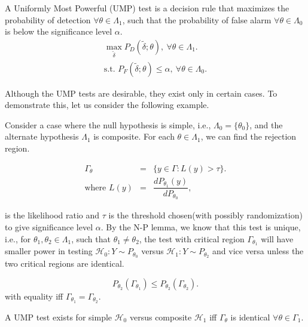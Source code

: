 \documentclass[a4paper,english,12pt]{article}
\begin{document}
\begin{defn}
A Uniformly Most Powerful (UMP) test is a decision rule that maximizes the probability of detection $\forall \theta \in \Lambda_1$, such that the probability of false alarm $\forall \theta \in \Lambda_0$ is below the significance level $\alpha$.
\begin{eqnarray*}
\max_{\tilde{\delta}}P_D(\tilde{\delta}; \theta), ~ \forall \theta \in \Lambda_1.\\
\mbox{s.t.  } P_F(\tilde{\delta}; \theta) \leq \alpha, ~ \forall \theta \in \Lambda_0.
\end{eqnarray*}	
\end{defn}

Although the UMP tests are desirable, they exist only in certain cases. To demonstrate this, let us consider the following example.
\begin{exmp} 
Consider a case where the null hypothesis is simple, i.e., $\Lambda_0 = \{\theta_0\}$, and the alternate hypothesis $\Lambda_1$ is composite. For each $\theta \in \Lambda_1$, we can find the rejection region.

\begin{eqnarray}
\Gamma_\theta &=& \{y \in \Gamma: L(y) > \tau\}.\\
\mbox{where  } L(y) &=& \dfrac{dP_{\theta_1}(y)}{dP_{\theta_0}},	
\end{eqnarray}	
	
is the likelihood ratio and $\tau$ is the threshold chosen(with possibly randomization) to give significance level $\alpha$. By the N-P lemma, we know that this test is unique, i.e., for $\theta_1, \theta_2 \in \Lambda_1$, such that $\theta_1 \neq \theta_2 $, the test with critical region $\Gamma_{\theta_1}$ will have smaller power in testing $\mathcal{H}_0: Y \sim P_{\theta_0}$ versus $\mathcal{H}_1: Y \sim P_{\theta_2}$ and vice versa unless the two critical regions are identical.
	
\begin{equation*}
P_{\theta_{2}}(\Gamma_{\theta_1}) \leq P_{\theta_{2}}(\Gamma_{\theta_2}).
\end{equation*}
with equality iff $\Gamma_{\theta_1} = \Gamma_{\theta_2}$.

\begin{cor}
{A UMP test exists for simple $\mathcal{H}_0$ versus composite $\mathcal{H}_1$ iff $\Gamma_\theta$ is identical $\forall \theta \in \Gamma_1$.}	
\end{cor}
\end{exmp}
	
\end{document}
